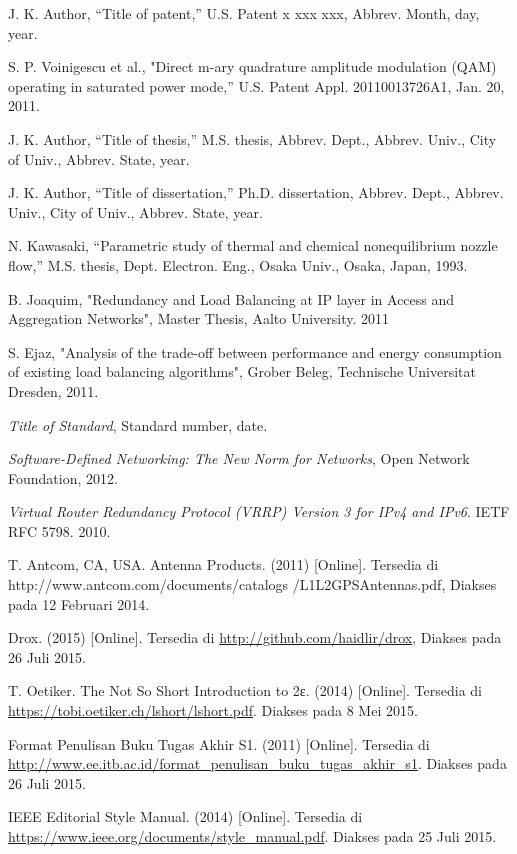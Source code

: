 \begin{thebibliography}{99}
{J. K. Author, “Title of patent,” U.S. Patent x xxx xxx, Abbrev. Month, day, year.}

{S. P. Voinigescu et al., "Direct m-ary quadrature amplitude modulation (QAM) operating in saturated power mode,” U.S. Patent Appl. 20110013726A1, Jan. 20, 2011.}

{J. K. Author, “Title of thesis,” M.S. thesis, Abbrev. Dept., Abbrev. Univ., City of Univ., Abbrev. State, year.}

{J. K. Author, “Title of dissertation,” Ph.D. dissertation, Abbrev. Dept., Abbrev. Univ., City of Univ., Abbrev. State, year.}

{N. Kawasaki, “Parametric study of thermal and chemical nonequilibrium nozzle flow,” M.S. thesis, Dept. Electron.
Eng., Osaka Univ., Osaka, Japan, 1993.}

{B. Joaquim, "Redundancy and Load Balancing at IP layer in Access and Aggregation Networks", Master Thesis, Aalto University. 2011}

{S. Ejaz, "Analysis of the trade-off between performance and energy consumption of existing load balancing algorithms", Grober Beleg, Technische Universitat Dresden, 2011.}

{\textit{Title of Standard}, Standard number, date.}

{\textit{Software-Defined Networking: The New Norm for Networks}, Open Network Foundation, 2012.}

{\textit{Virtual Router Redundancy Protocol (VRRP) Version 3 for IPv4 and IPv6}. IETF RFC 5798. 2010.}

T. Antcom, CA, USA. Antenna Products. (2011) [Online]. Tersedia di http://www.antcom.com/documents/catalogs /L1L2GPSAntennas.pdf, Diakses pada 12 Februari 2014.

Drox. (2015) [Online]. Tersedia di \url{http://github.com/haidlir/drox}, Diakses pada 26 Juli 2015.

{T. Oetiker. The Not So Short Introduction to \latex2ε. (2014) [Online]. Tersedia di \url{https://tobi.oetiker.ch/lshort/lshort.pdf}. 
Diakses pada 8 Mei 2015.}

{Format Penulisan Buku Tugas Akhir S1. (2011) [Online]. Tersedia di \url{http://www.ee.itb.ac.id/format_penulisan_buku_tugas_akhir_s1}. Diakses pada 26 Juli 2015.}

{IEEE Editorial Style Manual. (2014) [Online]. Tersedia di \url{https://www.ieee.org/documents/style_manual.pdf}. Diakses pada 25 Juli 2015.}

\end{thebibliography}
%
%